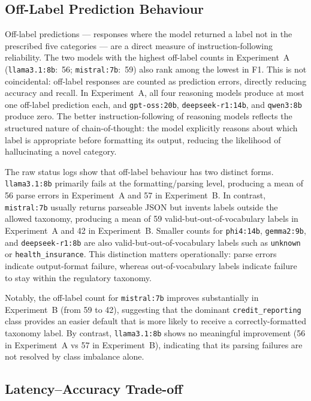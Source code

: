 \documentclass[journal]{IEEEtran}
\begin{document}
\subsection{Off-Label Prediction Behaviour}

Off-label predictions — responses where the model returned a label
not in the prescribed five categories — are a direct measure of
instruction-following reliability. The two models with the highest off-label counts in Experiment~A
(\texttt{llama3.1:8b}:~56; \texttt{mistral:7b}:~59)
also rank among the lowest in F1. This is
not coincidental: off-label responses are counted as prediction
errors, directly reducing accuracy and recall. In Experiment~A, all four
reasoning models produce at most one off-label prediction each, and
\texttt{gpt-oss:20b}, \texttt{deepseek-r1:14b}, and
\texttt{qwen3:8b} produce zero.
The better instruction-following of reasoning models reflects the
structured nature of chain-of-thought: the model explicitly reasons
about which label is appropriate before formatting its output,
reducing the likelihood of hallucinating a novel category.

The raw status logs show that off-label behaviour has two distinct
forms. \texttt{llama3.1:8b} primarily fails at the formatting/parsing
level, producing a mean of 56 parse errors in Experiment~A and 57 in
Experiment~B. In contrast, \texttt{mistral:7b} usually returns
parseable JSON but invents labels outside the allowed taxonomy,
producing a mean of 59 valid-but-out-of-vocabulary labels in
Experiment~A and 42 in Experiment~B. Smaller counts for \texttt{phi4:14b},
\texttt{gemma2:9b}, and \texttt{deepseek-r1:8b} are also
valid-but-out-of-vocabulary labels such as \texttt{unknown} or
\texttt{health\_insurance}. This distinction matters operationally:
parse errors indicate output-format failure, whereas out-of-vocabulary
labels indicate failure to stay within the regulatory taxonomy.

Notably, the off-label count for \texttt{mistral:7b} improves
substantially in Experiment~B (from 59 to 42), suggesting that the
dominant \texttt{credit\_reporting} class provides an easier default
that is more likely to receive a correctly-formatted taxonomy label.
By contrast, \texttt{llama3.1:8b} shows no meaningful improvement
(56 in Experiment~A vs 57 in Experiment~B), indicating that its
parsing failures are not resolved by class imbalance alone.

\subsection{Latency–Accuracy Trade-off}
\end{document}
